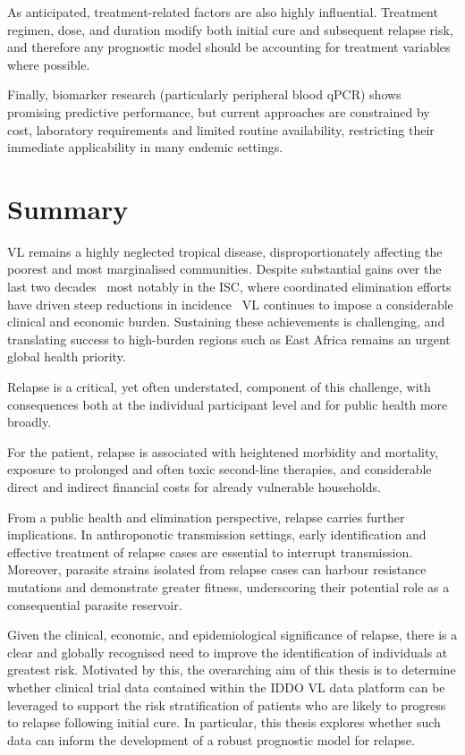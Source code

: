 As anticipated, treatment-related factors are also highly influential. Treatment regimen, dose, and duration modify both initial cure and subsequent relapse risk, and therefore any prognostic model should be accounting for treatment variables where possible.

Finally, biomarker research (particularly peripheral blood qPCR) shows promising predictive performance, but current approaches are constrained by cost, laboratory requirements and limited routine availability, restricting their immediate applicability in many endemic settings.

\section{Summary}

VL remains a highly neglected tropical disease, disproportionately affecting the poorest and most marginalised communities. Despite substantial gains over the last two decades \textemdash\  most notably in the ISC, where coordinated elimination efforts have driven steep reductions in incidence \textemdash\  VL continues to impose a considerable clinical and economic burden. Sustaining these achievements is challenging, and translating success to high-burden regions such as East Africa remains an urgent global health priority\cite{WHO_NTDs_Roadmap_2021_2030}.

Relapse is a critical, yet often understated, component of this challenge, with consequences both at the individual participant level and for public health more broadly.

For the patient, relapse is associated with heightened morbidity and mortality, exposure to prolonged and often toxic second-line therapies, and considerable direct and indirect financial costs for already vulnerable households\cite{sunyoto2019}.

From a public health and elimination perspective, relapse carries further implications. In anthroponotic transmission settings, early identification and effective treatment of relapse cases are essential to interrupt transmission. Moreover, parasite strains isolated from relapse cases can harbour resistance mutations and demonstrate greater fitness, underscoring their potential role as a consequential parasite reservoir.

Given the clinical, economic, and epidemiological significance of relapse, there is a clear and globally recognised need to improve the identification of individuals at greatest risk\cite{WHO2024_Leishmaniasis,WHO_2024_VL_easternAfrica}. Motivated by this, the overarching aim of this thesis is to determine whether clinical trial data contained within the IDDO VL data platform can be leveraged to support the risk stratification of patients who are likely to progress to relapse following initial cure. In particular, this thesis explores whether such data can inform the development of a robust prognostic model for relapse.

